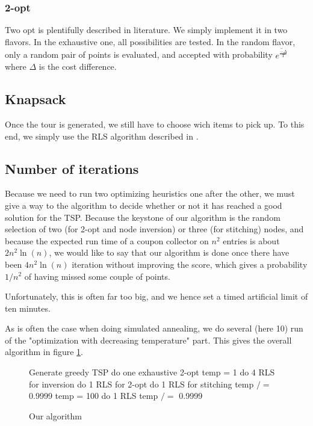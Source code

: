 \documentclass[fontsize=9pt,twocolumns,enabledeprecatedfontcommands]{scrartcl}
\begin{document}
\subsubsection{2-opt}
Two opt is plentifully described in literature. We simply implement it in two flavors. In the exhaustive one, all possibilities are tested. In the random flavor, only a random pair of points is evaluated, and accepted with probability $\overline{e^{\frac{-\Delta}{T}}}$ where $\Delta$ is the cost difference.

\subsection{Knapsack}
Once the tour is generated, we still have to choose wich items to pick up. To this end, we simply use the RLS algorithm described in \cite{Polyakovskiy}.

\subsection{Number of iterations}
Because we need to run two optimizing heuristics one after the other, we must give a way to the algorithm to decide whether or not it has reached a good solution for the TSP. Because the keystone of our algorithm is the random selection of two (for 2-opt and node inversion) or three (for stitching) nodes, and because the expected run time of a coupon collector on $n^2$ entries is about $2n^2\ln(n)$, we would like to say that our algorithm is done once there have been $4n^2\ln(n)$ iteration without improving the score, which gives a probability $1/n^2$ of having missed some couple of points.

Unfortunately, this is often far too big, and we hence set a timed artificial limit of ten minutes.

As is often the case when doing simulated annealing, we do several (here 10) run of the "optimization with decreasing temperature" part. This gives the overall algorithm in figure \ref{algo}.

\begin{figure}
\begin{algorithmic}
	\State Generate greedy TSP
	\State do one exhaustive 2-opt
	\State temp = 1
	\State do 4 RLS for inversion
	\State do 1 RLS for 2-opt
	\State do 1 RLS for stitching
	\State temp $/=$ 0.9999
	\EndWhile
	\EndFor
{}
\State temp = 100	
	\State do 1 RLS
	\State temp $/=$ 0.9999
	\EndWhile
	\EndFor

\end{algorithmic}
\caption{Our algorithm \label{algo}}
\end{figure} 
\end{document}
